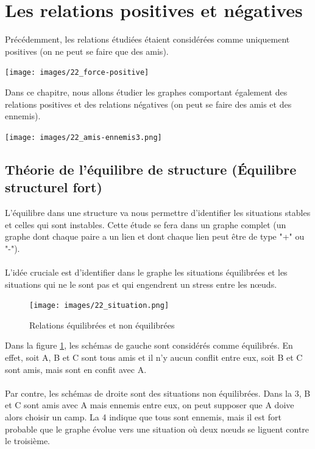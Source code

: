 \section{Les relations positives et négatives}

Précédemment, les relations étudiées étaient considérées comme uniquement positives (on ne peut se faire que des amis). 

\texttt{[image: images/22\_force-positive]}

Dans ce chapitre, nous allons étudier les graphes comportant également des relations positives et des relations négatives (on peut se faire des amis et des ennemis).

\texttt{[image: images/22\_amis-ennemis3.png]}

\subsection{Théorie de l'équilibre de structure (Équilibre structurel fort)}
L'équilibre dans une structure va nous permettre d'identifier les situations stables et celles qui sont instables. Cette étude se fera dans un graphe complet (un graphe dont chaque paire a un lien et dont chaque lien peut être de type "+" ou "-").

\paragraph{}
L'idée cruciale est d'identifier dans le graphe les situations équilibrées et les situations qui ne le sont pas et qui engendrent un stress entre les nœuds.  

\begin{figure}[h!]
	\centering
	\texttt{[image: images/22\_situation.png]}
	\caption{Relations équilibrées et non équilibrées}
    \label{equi}
\end{figure}


Dans la figure \ref{equi}, les schémas de gauche sont considérés comme équilibrés. En effet, soit A, B et C sont tous amis et il n'y aucun conflit entre eux, soit B et C sont amis, mais sont en confit avec A. 

\paragraph{}
Par contre, les schémas de droite sont des situations non équilibrées. Dans la 3, B et C sont amis avec A mais ennemis entre eux, on peut supposer que A doive alors choisir un camp. La 4 indique que tous sont ennemis, mais il est fort probable que le graphe évolue vers une situation où deux nœuds se liguent contre le troisième. 


